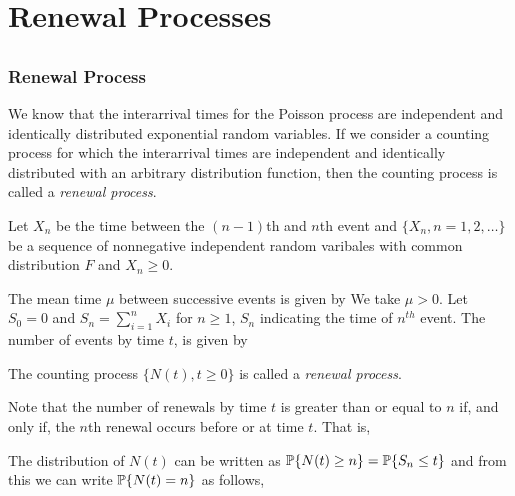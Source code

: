 \documentclass[all-lectures.tex]{subfiles}
\author{}
\begin{document}
\setcounter{chapter}{1}
\chapter{Renewal Processes}

\setcounter{section}{1}
\section*{}
\subsection{Renewal Process}
We know that the interarrival times for the Poisson process are independent and identically distributed exponential random variables.
If we consider a counting process for which the interarrival times are independent and identically distributed with an arbitrary distribution function, then the counting process is called a \textit{renewal process}.

Let $X_n$ be the time between the $(n-1)$th and $n$th event and $\{X_n,n=1,2,\dots\}$ be a sequence of nonnegative independent random varibales with common distribution $F$ and $X_n \ge 0$.

The mean time $\mu$ between successive events is given by
We take $\mu > 0$. Let $S_0=0$ and $S_n = \sum_{i=1}^{n} X_i$ for $n \ge 1$, $S_n$ indicating the time of $n^{th}$ event.
The number of events by time $t$, is given by

\begin{defn}
The counting process $\{ N(t),t \ge 0\}$ is called a \textit{renewal process}.
\end{defn}

Note that the number of renewals by time $t$ is greater than or equal to $n$ if, and only if, the $n$th renewal occurs before or at time $t$.
That is,

The distribution of $N(t)$ can be written as $\P\{N(t) \ge n\} = \P\{S_n \le t\}$ and from this we can write $\P\{N(t)=n\}$ as follows,
\end{document}
